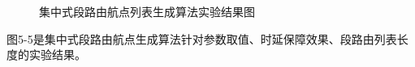 \begin{figure}[t]
{    \label{fig-ch3-test-3}
}
\hspace{0.00\linewidth}
\caption{集中式段路由航点列表生成算法实验结果图} 
\label{fig:test:centralised}
\end{figure}

图5-5是集中式段路由航点生成算法针对参数取值、时延保障效果、段路由列表长度的实验结果。

